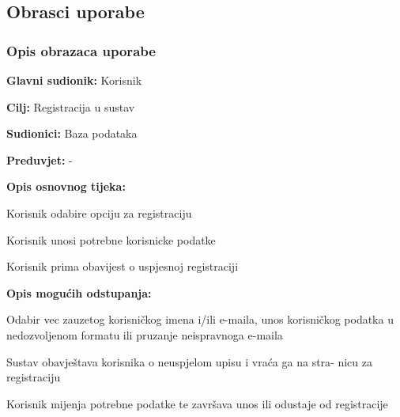 			\eject 
			
			
				
			\subsection{Obrasci uporabe}
				
				\subsubsection{Opis obrazaca uporabe}

				\noindent {}
					\begin{packed_item}
	
						\item \textbf{Glavni sudionik: } Korisnik
						\item  \textbf{Cilj:} Registracija u sustav
						\item  \textbf{Sudionici:} Baza podataka
						\item  \textbf{Preduvjet:} -
						\item  \textbf{Opis osnovnog tijeka:}
						
						\item[] \begin{packed_enum}
	
							\item Korisnik odabire opciju za registraciju
							\item Korisnik unosi potrebne korisnicke podatke
							\item Korisnik prima obavijest o uspjesnoj registraciji
						\end{packed_enum}
						
						\item  \textbf{Opis mogućih odstupanja:}
						
						\item[] \begin{packed_item}
	
							\item[2.a] Odabir vec zauzetog korisničkog imena i/ili e-maila, unos korisničkog
							podatka u nedozvoljenom formatu ili pruzanje neispravnoga e-maila
							\item[] \begin{packed_enum}
								
								\item Sustav obavještava korisnika o neuspjelom upisu i vraća ga na stra- 
								nicu za registraciju
								\item Korisnik mijenja potrebne podatke te završava unos ili odustaje od 
								registracije
								
							\end{packed_enum}
							
						\end{packed_item}
					\end{packed_item}

